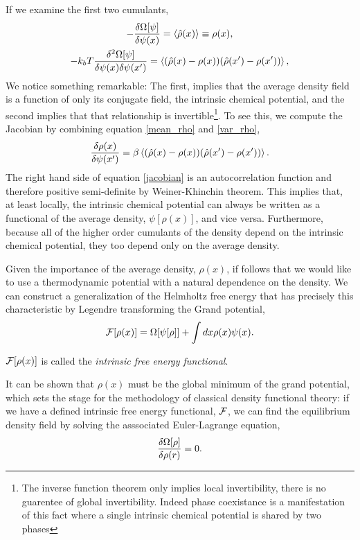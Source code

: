 If we examine the first two cumulants,
%
\begin{gather}
    \label{mean_rho}
    - \frac{\delta \Omega[\psi]}{\delta \psi(x)}
        = \left\langle \hat{\rho}(x) \right\rangle \equiv \rho(x), \\
    \label{var_rho} 
    -k_b T\frac{\delta^2 \Omega[\psi]}{\delta \psi(x) \delta \psi(x^\prime)}
        = \left\langle (\hat{\rho}(x) - \rho(x))
          (\hat{\rho}(x^\prime) - \rho(x^\prime)) \right\rangle,
\end{gather}
%
We notice something remarkable: The first, implies that the average density field is a function of only its conjugate
field, the intrinsic chemical potential, and the second implies that that
relationship is invertible\footnote{The inverse function theorem only implies
local invertibility, there is no guarentee of global invertibility. Indeed
phase coexistance is a manifestation of this fact where a single intrinsic
chemical potential is shared by two phases}.  To see this, we compute the 
Jacobian by combining equation \ref{mean_rho} and \ref{var_rho},
%
\begin{equation}
    \label{jacobian}
    \frac{\delta \rho(x)}{\delta \psi(x^\prime)} 
        = \beta \left\langle (\hat{\rho}(x) - \rho(x))
        (\hat{\rho}(x^\prime) - \rho(x^\prime)) \right\rangle.
\end{equation}
%
The right hand side of equation \ref{jacobian} is an autocorrelation function
and therefore positive semi-definite by Weiner-Khinchin theorem. This implies
that, at least locally, the intrinsic chemical potential can always be written
as a functional of the average density, $\psi[\rho(x)]$, and vice versa.
Furthermore, because all of the higher order cumulants of the density depend on
the intrinsic chemical potential, they too depend only on the average density.

Given the importance of the average density, $\rho(x)$, if follows that we would
like to use a thermodynamic potential with a natural dependence on the density.
We can construct a generalization of the Helmholtz free energy that has
precisely this characteristic by Legendre transforming the Grand potential,
%
\begin{equation}
    \mathcal{F}[\rho(x)] = \Omega[\psi[\rho]] + \int dx \rho(x) \psi(x).
\end{equation}
%

$\mathcal{F}[\rho(x)]$ is called the \textit{intrinsic free energy functional}.

It can be shown \cite{HansenAppendixB} that $\rho(x)$ must be the global minimum
of the grand potential, which sets the stage for the methodology of classical
density functional theory: if we have a defined intrinsic free energy
functional, $\mathcal{F}$, we can find the equilibrium density field by solving the
asssociated Euler-Lagrange equation, 
%
\begin{equation}
    \frac{\delta \Omega[\rho]}{\delta \rho(r)} = 0.
\end{equation}
%

